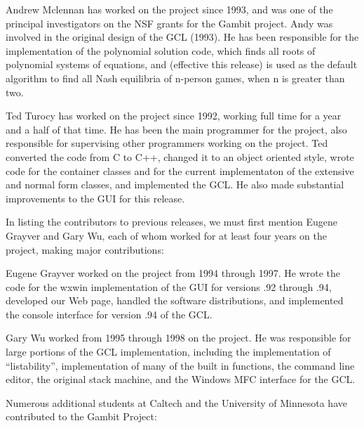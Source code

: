 Andrew Mclennan has worked on the project since 1993, and was one of
the principal investigators on the NSF grants for the Gambit project.
Andy was involved in the original design of the GCL (1993).  He has
been responsible for the implementation of the polynomial solution
code, which finds all roots of polynomial systems of equations, and
(effective this release) is used as the default algorithm to find all
Nash equilibria of n-person games, when n is greater than two.

Ted Turocy has worked on the project since 1992, working full time for
a year and a half of that time.  He has been the main programmer for
the project, also responsible for supervising other programmers
working on the project.  Ted converted the code from C to C++, changed
it to an object oriented style, wrote code for the container classes
and for the current implementaton of the extensive and normal form
classes, and implemented the GCL.  He also made substantial
improvements to the GUI for this release.

In listing the contributors to previous releases, we must
first mention Eugene Grayver and Gary Wu, each of whom worked
for at least four years on the project, making major contributions:

Eugene Grayver worked on the project from 1994 through 1997.
He wrote the code for the wxwin implementation of the GUI for versions
.92 through .94, developed our Web page, handled the software
distributions, and implemented the console interface for version .94
of the GCL.

Gary Wu worked from 1995 through 1998 on the project.  He was
responsible for large portions of the GCL implementation, including
the implementation of ``listability'', implementation of many of the
built in functions, the command line editor, the original stack
machine, and the Windows MFC interface for the GCL.

Numerous additional students at Caltech and the University of Minnesota
have contributed to the Gambit Project:

